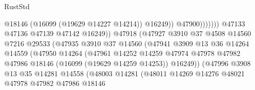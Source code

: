 \begin{lexlean}{RustStd}
\begin{coremodule}
                                                      @18146
                                                      (@16099 (@19629 @14227 @14214))
                                                      @16249))
                                                  @47900)))))))
                                    @47133
                                    @47136
                                    @47139
                                    @47142
                                    @16249))
                                @47918
                                (@47927
                                  @3910
                                  @37
                                  @4508
                                  @14560
                                  @7216
                                  @29533
                                  (@47935
                                    @3910
                                    @37
                                    @14560
                                    (@47941
                                      @3909
                                      @13
                                      @36
                                      @14264
                                      @14559
                                      (@47950
                                        @14264
                                        (@47961
                                          @14252
                                          @14259
                                          @47974
                                          @47978
                                          @47982
                                          @47986
                                          @18146
                                          (@16099 (@19629 @14259 @14253))
                                          @16249))
                                      (@47996
                                        @3908
                                        @13
                                        @35
                                        @14281
                                        @14558
                                        (@48003
                                          @14281
                                          (@48011
                                            @14269
                                            @14276
                                            @48021
                                            @47978
                                            @47982
                                            @47986
                                            @18146

\end{coremodule}
\end{lexlean}
